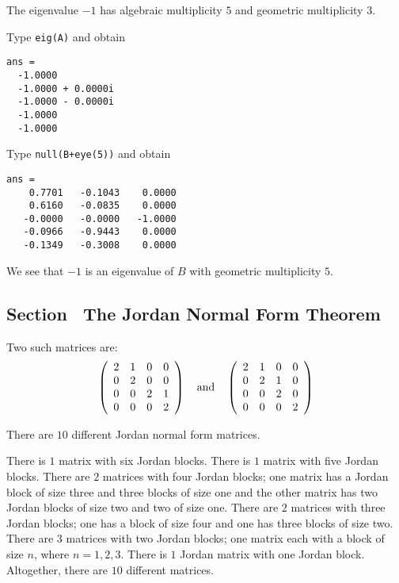 \newpage
{} \ans The eigenvalue $-1$ has algebraic multiplicity $5$ and geometric
multiplicity $3$.

\soln Type {\tt eig(A)} and obtain
\begin{verbatim}
ans =
  -1.0000          
  -1.0000 + 0.0000i
  -1.0000 - 0.0000i
  -1.0000          
  -1.0000         
\end{verbatim}
Type {\tt null(B+eye(5))}
and obtain
\begin{verbatim}
ans =
    0.7701   -0.1043    0.0000
    0.6160   -0.0835    0.0000
   -0.0000   -0.0000   -1.0000
   -0.0966   -0.9443    0.0000
   -0.1349   -0.3008    0.0000
\end{verbatim}
We see that $-1$ is an eigenvalue of $B$ with geometric multiplicity $5$. 



\subsection*{Section~\protect{\ref{S:JNF}} The Jordan Normal Form Theorem}


\ans Two such matrices are:
\[
\left(\begin{array}{rrrr}
2 & 1 & 0 & 0 \\
0 & 2 & 0 & 0 \\
0 & 0 & 2 & 1 \\
0 & 0 & 0 & 2 \end{array}\right)
\quad\mbox{and}\quad
\left(\begin{array}{rrrr}
2 & 1 & 0 & 0 \\
0 & 2 & 1 & 0 \\
0 & 0 & 2 & 0 \\
0 & 0 & 0 & 2 \end{array}\right)
\]

 \ans There are $10$ different Jordan normal form matrices.

\soln  There is $1$ matrix with six Jordan blocks.  There is $1$ matrix with five
Jordan blocks.  There are $2$ matrices with four Jordan blocks; one matrix has a
Jordan block of size three and three blocks of size one and the other matrix has two
Jordan blocks of size two and two of size one.  There are $2$ matrices with three
Jordan blocks; one has a block of size four and one has three blocks of size two.
There are $3$ matrices with two Jordan blocks; one matrix each with a block of
size $n$, where $n=1,2,3$.  There is $1$ Jordan matrix with one Jordan block. 
Altogether, there are $10$ different matrices.

